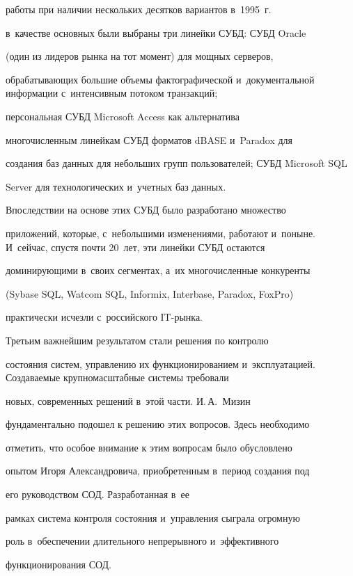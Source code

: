 работы при наличии нескольких десятков вариантов в~1995~г.\


в~качестве основных были выбраны три линейки СУБД: СУБД Oracle


(один из лидеров рынка на тот момент) для мощных серверов,


обрабатывающих большие объемы фактографической и~документальной информации с~интенсивным потоком транзакций;


персональная СУБД Microsoft Access как альтернатива


многочисленным линейкам СУБД форматов dBASE и~Paradox для


создания баз данных для небольших групп пользователей; СУБД Microsoft SQL


Server для технологических и~учетных баз данных.





     Впоследствии на основе этих СУБД было разработано множество


приложений, которые, с~небольшими изменениями, работают и~поныне. И~сейчас, спустя почти 20~лет, эти линейки СУБД остаются


доминирующими в~своих сегментах, а~их многочисленные конкуренты


(Sybase SQL, Watcom SQL, Informix, Interbase, Paradox, FoxPro)


практически исчезли с~российского IT-рынка.





     Третьим важнейшим результатом стали решения по контролю


состояния систем, управлению их функционированием и~эксплуатацией. Создаваемые крупномасштабные системы требовали


новых, современных решений в~этой части. И.\,А.~Мизин


фундаментально подошел к решению этих вопросов. Здесь необходимо


отметить, что особое внимание к этим вопросам было обусловлено


опытом Игоря Александровича, приобретенным в~период создания под


его руководством СОД. Разработанная в~ее


рамках система контроля состояния и~управления сыграла огромную


роль в~обеспечении длительного непрерывного и~эффективного


функционирования СОД.





